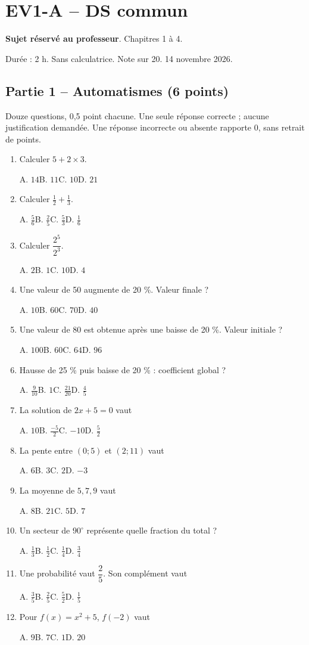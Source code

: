 \clearpage\section*{EV1-A -- DS commun}\label{EV1-A}
\textbf{Sujet réservé au professeur}. Chapitres 1 à 4.\par Durée : 2 h. Sans calculatrice. Note sur 20. 14 novembre 2026.
\subsection*{Partie 1 -- Automatismes (6 points)}
Douze questions, 0,5 point chacune. Une seule réponse correcte ; aucune justification demandée. Une réponse incorrecte ou absente rapporte 0, sans retrait de points.
\begin{enumerate}
\item Calculer $5+2\times3$.\par A. $14$\quad B. $11$\quad C. $10$\quad D. $21$
\item Calculer $\frac12+\frac13$.\par A. $\frac{5}{6}$\quad B. $\frac{2}{5}$\quad C. $\frac{5}{3}$\quad D. $\frac{1}{6}$
\item Calculer $\dfrac{2^5}{2^{3}}$.\par A. $2$\quad B. $1$\quad C. $10$\quad D. $4$
\item Une valeur de 50 augmente de 20 \%. Valeur finale ?\par A. $10$\quad B. $60$\quad C. $70$\quad D. $40$
\item Une valeur de 80 est obtenue après une baisse de 20 \%. Valeur initiale ?\par A. $100$\quad B. $60$\quad C. $64$\quad D. $96$
\item Hausse de 25 \% puis baisse de 20 \% : coefficient global ?\par A. $\frac{9}{10}$\quad B. $1$\quad C. $\frac{21}{20}$\quad D. $\frac{4}{5}$
\item La solution de $2x+5=0$ vaut\par A. $10$\quad B. $\frac{-5}{2}$\quad C. $-10$\quad D. $\frac{5}{2}$
\item La pente entre $(0;5)$ et $(2;11)$ vaut\par A. $6$\quad B. $3$\quad C. $2$\quad D. $-3$
\item La moyenne de $5, 7, 9$ vaut\par A. $8$\quad B. $21$\quad C. $5$\quad D. $7$
\item Un secteur de $90^\circ$ représente quelle fraction du total ?\par A. $\frac{1}{3}$\quad B. $\frac{1}{2}$\quad C. $\frac{1}{4}$\quad D. $\frac{3}{4}$
\item Une probabilité vaut $\dfrac{2}{5}$. Son complément vaut\par A. $\frac{3}{5}$\quad B. $\frac{2}{5}$\quad C. $\frac{5}{2}$\quad D. $\frac{1}{5}$
\item Pour $f(x)=x^2+5$, $f(-2)$ vaut\par A. $9$\quad B. $7$\quad C. $1$\quad D. $20$
\end{enumerate}
